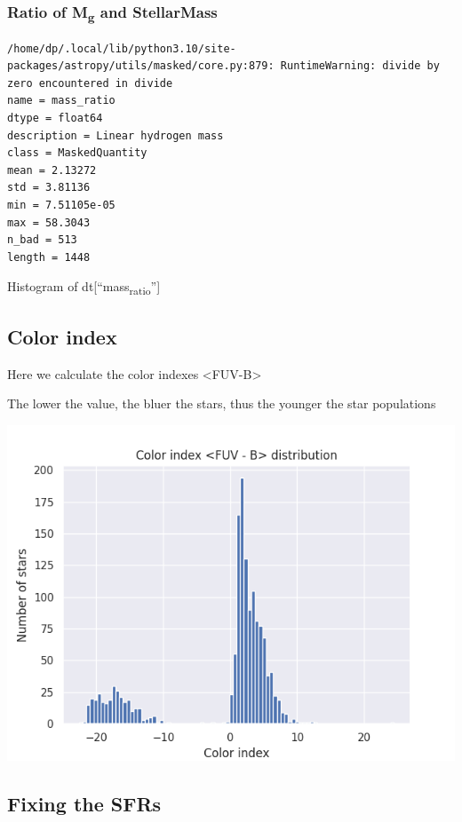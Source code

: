 \documentclass[a4paper]{article}
\begin{document}
\subsubsection{Ratio of M\textsubscript{g} and StellarMass}
\label{sec:org6ebf887}

\begin{verbatim}
/home/dp/.local/lib/python3.10/site-packages/astropy/utils/masked/core.py:879: RuntimeWarning: divide by zero encountered in divide
name = mass_ratio
dtype = float64
description = Linear hydrogen mass
class = MaskedQuantity
mean = 2.13272
std = 3.81136
min = 7.51105e-05
max = 58.3043
n_bad = 513
length = 1448
\end{verbatim}

Histogram of dt[``mass\textsubscript{ratio}'']

\subsection{Color index}
\label{sec:orgdc5850f}

Here we calculate the color indexes <FUV-B>

The lower the value, the bluer the stars, thus the younger the star populations

\begin{center}
\includegraphics[width=.9\linewidth]{./figure/color_index.png}
\end{center}

\subsection{Fixing the SFRs}
\label{sec:orgbc555ea}
\end{document}
